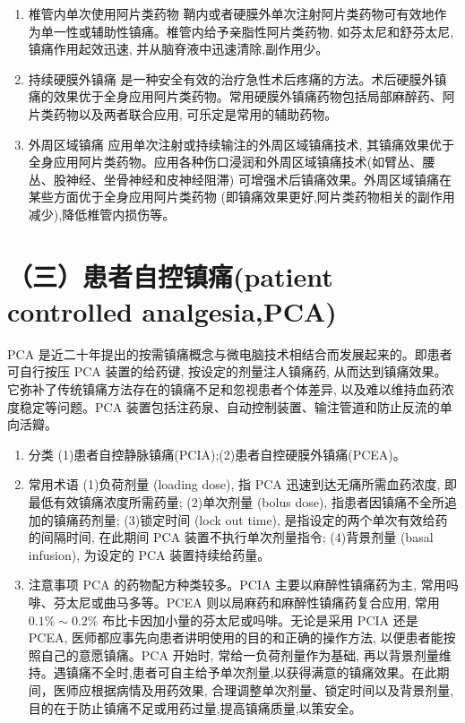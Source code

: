 \documentclass[10pt]{article}
\begin{document}
\begin{enumerate}
  \item 椎管内单次使用阿片类药物 鞘内或者硬膜外单次注射阿片类药物可有效地作为单一性或辅助性镇痛。椎管内给予亲脂性阿片类药物, 如芬太尼和舒芬太尼, 镇痛作用起效迅速, 并从脑脊液中迅速清除,副作用少。

  \item 持续硬膜外镇痛 是一种安全有效的治疗急性术后疼痛的方法。术后硬膜外镇痛的效果优于全身应用阿片类药物。常用硬膜外镇痛药物包括局部麻醉药、阿片类药物以及两者联合应用, 可乐定是常用的辅助药物。

  \item 外周区域镇痛 应用单次注射或持续输注的外周区域镇痛技术, 其镇痛效果优于全身应用阿片类药物。应用各种伤口浸润和外周区域镇痛技术(如臂丛、腰丛、股神经、坐骨神经和皮神经阻滞) 可增强术后镇痛效果。外周区域镇痛在某些方面优于全身应用阿片类药物 (即镇痛效果更好,阿片类药物相关的副作用减少),降低椎管内损伤等。

\end{enumerate}

\section*{（三）患者自控镇痛(patient controlled analgesia,PCA)}
PCA 是近二十年提出的按需镇痛概念与微电脑技术相结合而发展起来的。即患者可自行按压 PCA 装置的给药键, 按设定的剂量注人镇痛药, 从而达到镇痛效果。它弥补了传统镇痛方法存在的镇痛不足和忽视患者个体差异, 以及难以维持血药浓度稳定等问题。PCA 装置包括注药泉、自动控制装置、输注管道和防止反流的单向活瓣。

\begin{enumerate}
  \item 分类 (1)患者自控静脉镇痛(PCIA);(2)患者自控硬膜外镇痛(PCEA)。

  \item 常用术语 (1)负荷剂量 (loading dose), 指 PCA 迅速到达无痛所需血药浓度, 即最低有效镇痛浓度所需药量; (2)单次剂量 (bolus dose), 指患者因镇痛不全所追加的镇痛药剂量; (3)锁定时间 (lock out time), 是指设定的两个单次有效给药的间隔时间, 在此期间 PCA 装置不执行单次剂量指令; (4)背景剂量 (basal infusion), 为设定的 PCA 装置持续给药量。

  \item 注意事项 PCA 的药物配方种类较多。PCIA 主要以麻醉性镇痛药为主, 常用吗啡、芬太尼或曲马多等。PCEA 则以局麻药和麻醉性镇痛药复合应用, 常用 $0.1 \% \sim 0.2 \%$ 布比卡因加小量的芬太尼或吗啡。无论是采用 PCIA 还是 PCEA, 医师都应事先向患者讲明使用的目的和正确的操作方法, 以便患者能按照自己的意愿镇痛。PCA 开始时, 常给一负荷剂量作为基础, 再以背景剂量维持。遇镇痛不全时,患者可自主给予单次剂量,以获得满意的镇痛效果。在此期间，医师应根据病情及用药效果, 合理调整单次剂量、锁定时间以及背景剂量, 目的在于防止镇痛不足或用药过量,提高镇痛质量,以策安全。

\end{enumerate}
\end{document}

